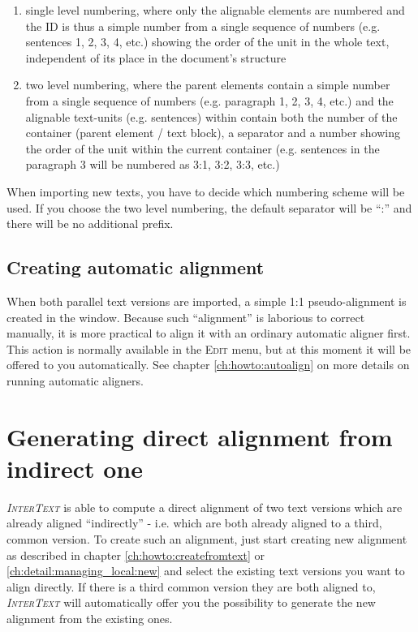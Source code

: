 \documentclass[a4paper,10pt,oneside]{book}
\newcommand{\IT}{\textit{\textsc{InterText}}\xspace}
\newcommand{\menu}[1]{\textsc{#1}}
\begin{document}
\begin{enumerate}
 \item single level numbering, where only the alignable elements are numbered and the ID is thus a simple number from a single sequence of numbers (e.g. sentences 1, 2, 3, 4, etc.) showing the order of the unit in the whole text, independent of its place in the document's structure
 \item two level numbering, where the parent elements contain a simple number from a single sequence of numbers (e.g. paragraph 1, 2, 3, 4, etc.) and the alignable text-units (e.g. sentences) within contain both the number of the container (parent element / text block), a separator and a number showing the order of the unit within the current container (e.g. sentences in the paragraph 3 will be numbered as 3:1, 3:2, 3:3, etc.)
\end{enumerate}

When importing new texts, you have to decide which numbering scheme will be used. If you choose the two level numbering, the default separator will be ``:'' and there will be no additional prefix.

\subsection{Creating automatic alignment}\label{ch:detail:managing_local:new:align}

When both parallel text versions are imported, a simple 1:1 pseudo-alignment is created in the window. Because such ``alignment'' is laborious to correct manually, it is more practical to align it with an ordinary automatic aligner first. This action is normally available in the \menu{Edit} menu, but at this moment it will be offered to you automatically. See chapter \ref{ch:howto:autoalign} on more details on running automatic aligners.

\section{Generating direct alignment from indirect one}\label{ch:detail:managing_local:generate}

\IT is able to compute a direct alignment of two text versions which are already aligned ``indirectly'' - i.e. which are both already aligned to a third, common version. To create such an alignment, just start creating new alignment as described in chapter \ref{ch:howto:createfromtext} or \ref{ch:detail:managing_local:new} and select the existing text versions you want to align directly. If there is a third common version they are both aligned to, \IT will automatically offer you the possibility to generate the new alignment from the existing ones.
\end{document}
